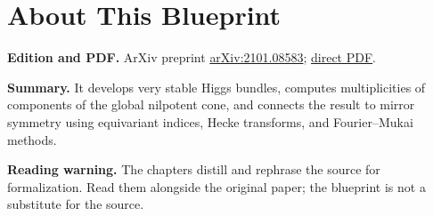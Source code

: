 

\chapter*{About This Blueprint}
\label{very-stable-higgs-bundles-equivariant-multiplicity-mirror-symmetry-about}


\textbf{Edition and PDF.} ArXiv preprint \href{https://arxiv.org/abs/2101.08583}{arXiv:2101.08583}; \href{https://arxiv.org/pdf/2101.08583}{direct PDF}.

\textbf{Summary.} It develops very stable Higgs bundles, computes multiplicities of components of the global nilpotent cone, and connects the result to mirror symmetry using equivariant indices, Hecke transforms, and Fourier--Mukai methods.

\textbf{Reading warning.} The chapters distill and rephrase the source for formalization. Read them alongside the original paper; the blueprint is not a substitute for the source.












